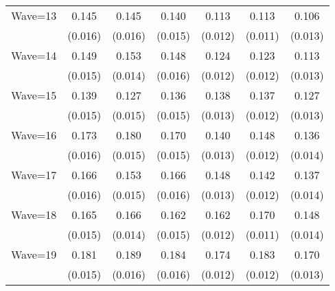 {\begin{tabular}{l*{6}{c}}
Wave=13             &       0.145\sym{***}&       0.145\sym{***}&       0.140\sym{***}&       0.113\sym{***}&       0.113\sym{***}&       0.106\sym{***}\\
                    &     (0.016)         &     (0.016)         &     (0.015)         &     (0.012)         &     (0.011)         &     (0.013)         \\
Wave=14             &       0.149\sym{***}&       0.153\sym{***}&       0.148\sym{***}&       0.124\sym{***}&       0.123\sym{***}&       0.113\sym{***}\\
                    &     (0.015)         &     (0.014)         &     (0.016)         &     (0.012)         &     (0.012)         &     (0.013)         \\
Wave=15             &       0.139\sym{***}&       0.127\sym{***}&       0.136\sym{***}&       0.138\sym{***}&       0.137\sym{***}&       0.127\sym{***}\\
                    &     (0.015)         &     (0.015)         &     (0.015)         &     (0.013)         &     (0.012)         &     (0.013)         \\
Wave=16             &       0.173\sym{***}&       0.180\sym{***}&       0.170\sym{***}&       0.140\sym{***}&       0.148\sym{***}&       0.136\sym{***}\\
                    &     (0.016)         &     (0.015)         &     (0.015)         &     (0.013)         &     (0.012)         &     (0.014)         \\
Wave=17             &       0.166\sym{***}&       0.153\sym{***}&       0.166\sym{***}&       0.148\sym{***}&       0.142\sym{***}&       0.137\sym{***}\\
                    &     (0.016)         &     (0.015)         &     (0.016)         &     (0.013)         &     (0.012)         &     (0.014)         \\
Wave=18             &       0.165\sym{***}&       0.166\sym{***}&       0.162\sym{***}&       0.162\sym{***}&       0.170\sym{***}&       0.148\sym{***}\\
                    &     (0.015)         &     (0.014)         &     (0.015)         &     (0.012)         &     (0.011)         &     (0.014)         \\
Wave=19             &       0.181\sym{***}&       0.189\sym{***}&       0.184\sym{***}&       0.174\sym{***}&       0.183\sym{***}&       0.170\sym{***}\\
                    &     (0.015)         &     (0.016)         &     (0.016)         &     (0.012)         &     (0.012)         &     (0.013)         \\

\end{tabular}}
